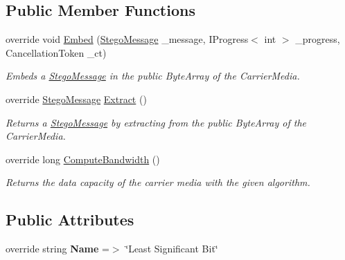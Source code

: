 \subsection*{Public Member Functions}
\begin{DoxyCompactItemize}
\item 
override void \hyperlink{class_stegosaurus_1_1_algorithm_1_1_l_s_b_algorithm_a8899e46584f804ea4c08741d6cc48b08}{Embed} (\hyperlink{class_stegosaurus_1_1_stego_message}{Stego\+Message} \+\_\+message, I\+Progress$<$ int $>$ \+\_\+progress, Cancellation\+Token \+\_\+ct)
\begin{DoxyCompactList}\small\item\em Embeds a \hyperlink{class_stegosaurus_1_1_stego_message}{Stego\+Message} in the public Byte\+Array of the Carrier\+Media. \end{DoxyCompactList}\item 
override \hyperlink{class_stegosaurus_1_1_stego_message}{Stego\+Message} \hyperlink{class_stegosaurus_1_1_algorithm_1_1_l_s_b_algorithm_a4c0597f5f93e47dc5a8ad58d06c9b189}{Extract} ()
\begin{DoxyCompactList}\small\item\em Returns a \hyperlink{class_stegosaurus_1_1_stego_message}{Stego\+Message} by extracting from the public Byte\+Array of the Carrier\+Media. \end{DoxyCompactList}\item 
override long \hyperlink{class_stegosaurus_1_1_algorithm_1_1_l_s_b_algorithm_a4e3b04a0820a9d819c38d5ec38d3eeaa}{Compute\+Bandwidth} ()
\begin{DoxyCompactList}\small\item\em Returns the data capacity of the carrier media with the given algorithm. \end{DoxyCompactList}\end{DoxyCompactItemize}
\subsection*{Public Attributes}
\begin{DoxyCompactItemize}
\item 
override string {\bfseries Name} =$>$ \char`\"{}Least Significant Bit\char`\"{}\hypertarget{class_stegosaurus_1_1_algorithm_1_1_l_s_b_algorithm_a4919f3b865726ed1c81a20214eb3bb4b}{}\label{class_stegosaurus_1_1_algorithm_1_1_l_s_b_algorithm_a4919f3b865726ed1c81a20214eb3bb4b}

\end{DoxyCompactItemize}
